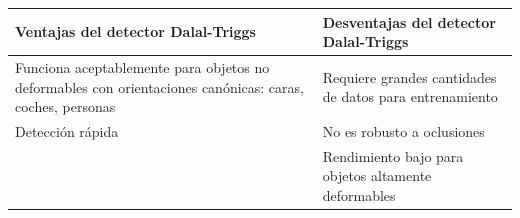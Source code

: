 \begin{table}[h]
\centering
\begin{tabular}{p{6.5cm}|p{6.5cm}}
Ventajas del detector Dalal-Triggs & Desventajas del detector Dalal-Triggs \\ \hline
Funciona aceptablemente para objetos no deformables con orientaciones canónicas: caras, coches, personas & Requiere grandes cantidades de datos para entrenamiento \\
Detección rápida & No es robusto a oclusiones \\
 & Rendimiento bajo para objetos altamente deformables
\end{tabular}
\end{table}